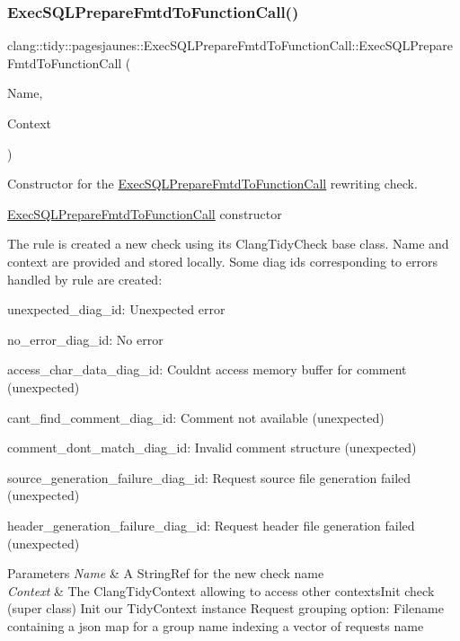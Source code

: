 \subsubsection{\texorpdfstring{Exec\+S\+Q\+L\+Prepare\+Fmtd\+To\+Function\+Call()}{ExecSQLPrepareFmtdToFunctionCall()}}
{\footnotesize\ttfamily clang\+::tidy\+::pagesjaunes\+::\+Exec\+S\+Q\+L\+Prepare\+Fmtd\+To\+Function\+Call\+::\+Exec\+S\+Q\+L\+Prepare\+Fmtd\+To\+Function\+Call (\begin{DoxyParamCaption}\item[{String\+Ref}]{Name,  }\item[{Clang\+Tidy\+Context $\ast$}]{Context }\end{DoxyParamCaption})}



Constructor for the \hyperlink{classclang_1_1tidy_1_1pagesjaunes_1_1_exec_s_q_l_prepare_fmtd_to_function_call}{Exec\+S\+Q\+L\+Prepare\+Fmtd\+To\+Function\+Call} rewriting check. 

\hyperlink{classclang_1_1tidy_1_1pagesjaunes_1_1_exec_s_q_l_prepare_fmtd_to_function_call}{Exec\+S\+Q\+L\+Prepare\+Fmtd\+To\+Function\+Call} constructor

The rule is created a new check using its {\ttfamily Clang\+Tidy\+Check} base class. Name and context are provided and stored locally. Some diag ids corresponding to errors handled by rule are created\+:
\begin{DoxyItemize}
\item unexpected\+\_\+diag\+\_\+id\+: Unexpected error
\item no\+\_\+error\+\_\+diag\+\_\+id\+: No error
\item access\+\_\+char\+\_\+data\+\_\+diag\+\_\+id\+: Couldn\textquotesingle{}t access memory buffer for comment (unexpected)
\item cant\+\_\+find\+\_\+comment\+\_\+diag\+\_\+id\+: Comment not available (unexpected)
\item comment\+\_\+dont\+\_\+match\+\_\+diag\+\_\+id\+: Invalid comment structure (unexpected)
\item source\+\_\+generation\+\_\+failure\+\_\+diag\+\_\+id\+: Request source file generation failed (unexpected)
\item header\+\_\+generation\+\_\+failure\+\_\+diag\+\_\+id\+: Request header file generation failed (unexpected)
\end{DoxyItemize}


\begin{DoxyParams}{Parameters}
{\em Name} & A String\+Ref for the new check name \\
\hline
{\em Context} & The Clang\+Tidy\+Context allowing to access other contexts\+Init check (super class) Init our Tidy\+Context instance Request grouping option\+: Filename containing a json map for a group name indexing a vector of requests name \\
\hline
\end{DoxyParams}



